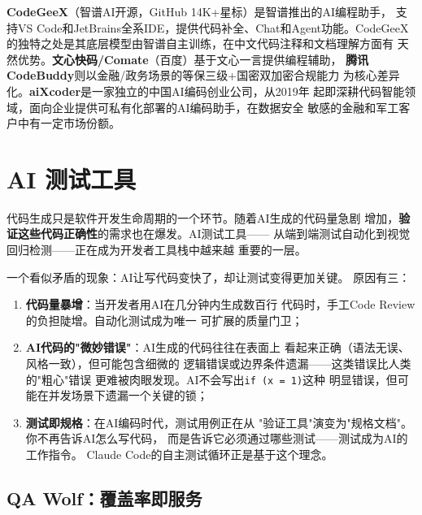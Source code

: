\textbf{CodeGeeX}（智谱AI开源，GitHub 14K+星标）是智谱推出的AI编程助手，
支持VS Code和JetBrains全系IDE，提供代码补全、Chat和Agent功能。CodeGeeX
的独特之处是其底层模型由智谱自主训练，在中文代码注释和文档理解方面有
天然优势。\textbf{文心快码/Comate}（百度）基于文心一言提供编程辅助，
\textbf{腾讯CodeBuddy}则以金融/政务场景的等保三级+国密双加密合规能力
为核心差异化。\textbf{aiXcoder}是一家独立的中国AI编码创业公司，从2019年
起即深耕代码智能领域，面向企业提供可私有化部署的AI编码助手，在数据安全
敏感的金融和军工客户中有一定市场份额。


\section{AI 测试工具}
\label{sec:devtools-testing}

代码生成只是软件开发生命周期的一个环节。随着AI生成的代码量急剧
增加，\textbf{验证这些代码正确性}的需求也在爆发。AI测试工具——
从端到端测试自动化到视觉回归检测——正在成为开发者工具栈中越来越
重要的一层。

\begin{whybox}[AI为什么让测试更加重要？]
一个看似矛盾的现象：AI让写代码变快了，却让测试变得更加关键。
原因有三：
\begin{enumerate}
  \item \textbf{代码量暴增}：当开发者用AI在几分钟内生成数百行
    代码时，手工Code Review的负担陡增。自动化测试成为唯一
    可扩展的质量门卫；
  \item \textbf{AI代码的"微妙错误"}：AI生成的代码往往在表面上
    看起来正确（语法无误、风格一致），但可能包含细微的
    逻辑错误或边界条件遗漏——这类错误比人类的"粗心"错误
    更难被肉眼发现。AI不会写出\texttt{if (x = 1)}这种
    明显错误，但可能在并发场景下遗漏一个关键的锁；
  \item \textbf{测试即规格}：在AI编码时代，测试用例正在从
    "验证工具"演变为"规格文档"。你不再告诉AI怎么写代码，
    而是告诉它必须通过哪些测试——测试成为AI的工作指令。
    Claude Code的自主测试循环正是基于这个理念。
\end{enumerate}
\end{whybox}

\subsection{QA Wolf：覆盖率即服务}
\label{subsec:qa-wolf}

